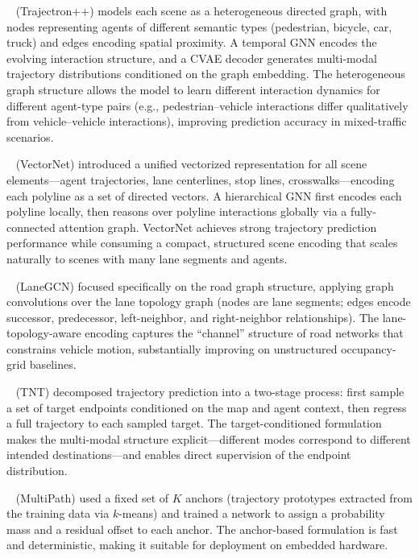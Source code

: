 \documentclass[12pt, a4paper]{article}
\begin{document}
\citeauthor{salzmann2020trajectron}~\cite{salzmann2020trajectron}
(Trajectron++) models each scene as a heterogeneous directed graph, with nodes
representing agents of different semantic types (pedestrian, bicycle, car,
truck) and edges encoding spatial proximity.  A temporal GNN encodes the
evolving interaction structure, and a CVAE decoder generates multi-modal
trajectory distributions conditioned on the graph embedding.  The heterogeneous
graph structure allows the model to learn different interaction dynamics for
different agent-type pairs (e.g., pedestrian--vehicle interactions differ
qualitatively from vehicle--vehicle interactions), improving prediction accuracy
in mixed-traffic scenarios.

\citeauthor{gao2020vectornet}~\cite{gao2020vectornet} (VectorNet) introduced
a unified vectorized representation for all scene elements---agent trajectories,
lane centerlines, stop lines, crosswalks---encoding each polyline as a set of
directed vectors.  A hierarchical GNN first encodes each polyline locally, then
reasons over polyline interactions globally via a fully-connected attention graph.
VectorNet achieves strong trajectory prediction performance while consuming a
compact, structured scene encoding that scales naturally to scenes with many
lane segments and agents.

\citeauthor{liang2020lanegcn}~\cite{liang2020lanegcn} (LaneGCN) focused
specifically on the road graph structure, applying graph convolutions over the
lane topology graph (nodes are lane segments; edges encode successor,
predecessor, left-neighbor, and right-neighbor relationships).  The
lane-topology-aware encoding captures the ``channel'' structure of road networks
that constrains vehicle motion, substantially improving on unstructured
occupancy-grid baselines.

\citeauthor{zhao2020tnt}~\cite{zhao2020tnt} (TNT) decomposed trajectory
prediction into a two-stage process: first sample a set of target endpoints
conditioned on the map and agent context, then regress a full trajectory to
each sampled target.  The target-conditioned formulation makes the multi-modal
structure explicit---different modes correspond to different intended
destinations---and enables direct supervision of the endpoint distribution.

\citeauthor{chai2019multipath}~\cite{chai2019multipath} (MultiPath) used a
fixed set of $K$ anchors (trajectory prototypes extracted from the training
data via $k$-means) and trained a network to assign a probability mass and a
residual offset to each anchor.  The anchor-based formulation is fast and
deterministic, making it suitable for deployment on embedded hardware.
\end{document}
